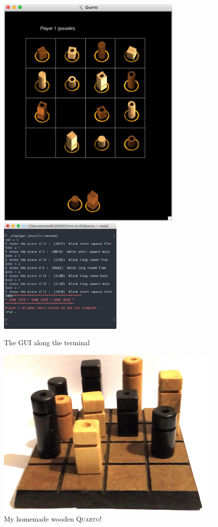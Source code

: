 \documentclass[a4paper,11pt]{article}
\begin{document}
		\begin{figure}[ht]
			\begin{center}
				\includegraphics[width=9cm]{include/gui1.png}
				\includegraphics[width=6cm]{include/gui2.png}
			\caption{The GUI along the terminal}
			\end{center}
		\end{figure}

		\begin{figure}[ht]
			\begin{center}
				\includegraphics[width=\linewidth]{include/homemade-quarto.jpg}
			\end{center}
			\caption{My homemade wooden \textsc{Quarto!}}
		\end{figure}
\end{document}

